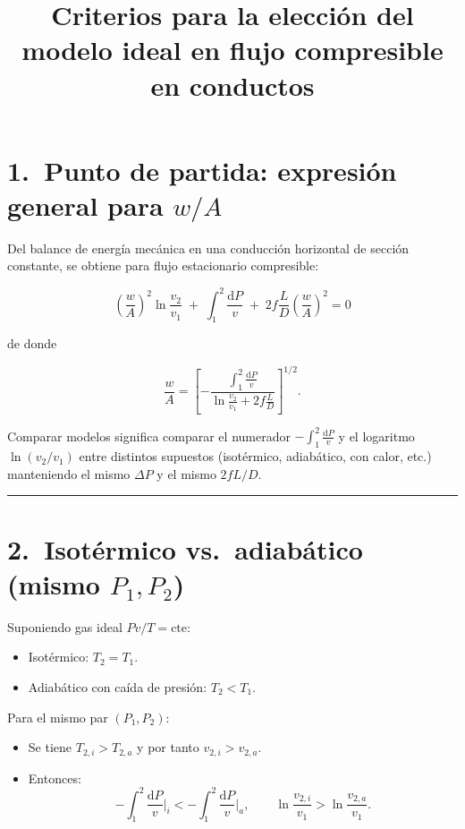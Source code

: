 \documentclass[11pt,a4paper]{article}
\begin{document}
\title{Criterios para la elección del modelo ideal en flujo compresible en conductos}
\author{}
\date{}
\maketitle

\section*{1.\ Punto de partida: expresión general para \texorpdfstring{$w/A$}{w/A}}

Del balance de energía mecánica en una conducción horizontal de sección constante, se obtiene para flujo estacionario compresible:

\begin{equation}
\left(\frac{w}{A}\right)^2 \ln\!\frac{v_2}{v_1}
\;+\;\int_1^2 \frac{\mathrm dP}{v}
\;+\;2 f \frac{L}{D}\left(\frac{w}{A}\right)^2 = 0
\end{equation}

de donde

\begin{equation}
\frac{w}{A}
=
\left[
-\frac{\displaystyle \int_1^2 \frac{\mathrm dP}{v}}
{\displaystyle \ln\!\frac{v_2}{v_1} + 2 f\frac{L}{D}}
\right]^{1/2}.
\end{equation}

Comparar modelos significa comparar el numerador
\(-\displaystyle\int_1^2 \frac{\mathrm dP}{v}\)
y el logaritmo \(\ln(v_2/v_1)\) entre distintos supuestos
(isotérmico, adiabático, con calor, etc.) manteniendo el mismo
\(\Delta P\) y el mismo \(2fL/D\).

\bigskip
\hrule
\bigskip

\section*{2.\ Isotérmico vs.\ adiabático (mismo \(P_1,P_2\))}

Suponiendo gas ideal \(Pv/T=\text{cte}\):

\begin{itemize}
  \item Isotérmico: \(T_2 = T_1\).
  \item Adiabático con caída de presión: \(T_2 < T_1\).
\end{itemize}

Para el mismo par \((P_1,P_2)\):

\begin{itemize}
  \item Se tiene \(T_{2,i} > T_{2,a}\) y por tanto \(v_{2,i} > v_{2,a}\).
  \item Entonces:
  \[
  -\int_1^2 \frac{\mathrm dP}{v}\bigg|_i
  <
  -\int_1^2 \frac{\mathrm dP}{v}\bigg|_a,
  \qquad
  \ln\frac{v_{2,i}}{v_1}
  >
  \ln\frac{v_{2,a}}{v_1}.
  \]
\end{itemize}
\end{document}
